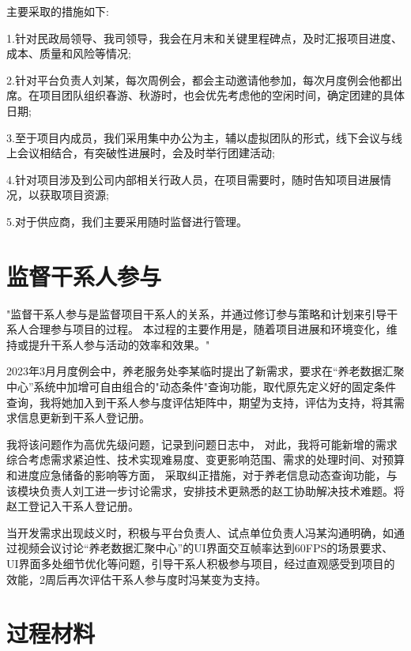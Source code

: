 \documentclass[UTF8]{../computerUniverse}
\begin{document}
主要采取的措施如下:

1.针对民政局领导、我司领导，我会在月末和关键里程碑点，及时汇报项目进度、成本、质量和风险等情况;

2.针对平台负责人刘某，每次周例会，都会主动邀请他参加，每次月度例会他都出席。在项目团队组织春游、秋游时，也会优先考虑他的空闲时间，确定团建的具体日期;

3.至于项目内成员，我们采用集中办公为主，辅以虚拟团队的形式，线下会议与线上会议相结合，有突破性进展时，会及时举行团建活动;

4.针对项目涉及到公司内部相关行政人员，在项目需要时，随时告知项目进展情况，以获取项目资源;

5.对于供应商，我们主要采用随时监督进行管理。




\section{监督干系人参与}

"监督干系人参与是监督项目干系人的关系，并通过修订参与策略和计划来引导干系人合理参与项目的过程。
本过程的主要作用是，随着项目进展和环境变化，维持或提升干系人参与活动的效率和效果。"

2023年3月月度例会中，养老服务处李某临时提出了新需求，要求在“养老数据汇聚中心”系统中加增可自由组合的"动态条件"查询功能，取代原先定义好的固定条件查询，我将她加入到干系人参与度评估矩阵中，期望为支持，评估为支持，将其需求信息更新到干系人登记册。

我将该问题作为高优先级问题，记录到问题日志中，
对此，我将可能新增的需求综合考虑需求紧迫性、技术实现难易度、变更影响范围、需求的处理时间、对预算和进度应急储备的影响等方面，
采取纠正措施，对于养老信息动态查询功能，与该模块负责人刘工进一步讨论需求，安排技术更熟悉的赵工协助解决技术难题。将赵工登记入干系人登记册。

当开发需求出现歧义时，积极与平台负责人、试点单位负责人冯某沟通明确，如通过视频会议讨论“养老数据汇聚中心”的UI界面交互帧率达到60FPS的场景要求、UI界面多处细节优化等问题，引导干系人积极参与项目，经过直观感受到项目的效能，2周后再次评估干系人参与度时冯某变为支持。



\section{过程材料}

\begin{lstlisting}
   

\end{lstlisting}
\end{document}
